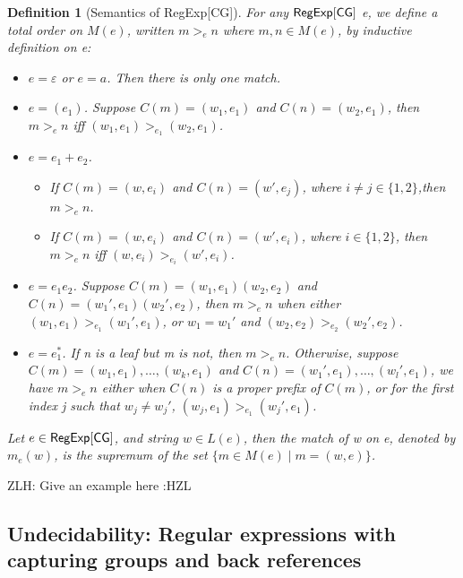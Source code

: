 \documentclass[sigplan,review,anonymous]{acmart}\settopmatter{printfolios=true,printccs=false,printacmref=false}
\newcommand{\zhilei}[1]{\color{violet} {ZLH: #1 :HZL} \color{black}}
\newcommand{\zhilei}[1]{}
\newtheorem{definition}{Definition}
\begin{document}
\begin{definition}[Semantics of RegExp{[\sf CG]}]
  For any ${\sf RegExp}[\sf CG]$ e, we define a total order on $M (e)$, written $m
  >_e n$ where $m, n \in M (e)$, by inductive definition on e:
  \begin{itemize}
    \item $e = \varepsilon$ or $e = a$. Then there is only one match.
    
    \item $e = (e_1)$. Suppose $C (m) = (w_1, e_1)$ and $C (n) = (w_2, e_1)$,
    then $m >_e n$ iff $(w_1, e_1) >_{e_1} (w_2, e_1)$.
    
    \item $e = e_1 + e_2$.
    \begin{itemize}
      \item If $C (m) = (w, e_i)$ and $C (n) = (w', e_j)$, where $i \neq j \in
      \{ 1, 2 \}$,then $m >_e n$.
      
      \item If $C (m) = (w, e_i)$ and $C (n) = (w', e_i)$, where $i \in \{ 1,
      2 \}$, then $m >_e n$ iff $(w, e_i) >_{e_i} (w', e_i)$.
    \end{itemize}
    \item $e = e_1 e_2$. Suppose $C (m) = (w_1, e_1) (w_2, e_2)$ and $C (n) =
    (w_1', e_1) (w_2', e_2)$, then $m >_e n$ when either $(w_1, e_1) >_{e_1}
    (w_1', e_1)$, or $w_1 = w_1'$ and $(w_2, e_2) >_{e_2} (w_2', e_2)$.
    
    \item $e = e_1^{\ast}$. If n is a leaf but m is not, then $m >_e n$.
    Otherwise, suppose $C (m) = (w_1, e_1), \ldots, (w_k, e_1)$ and $C (n) =
    (w_1', e_1), \ldots, (w_l', e_1)$, we have $m >_e n$ either when $C (n)$
    is a proper prefix of $C (m)$, or for the first index j such that $w_j
    \neq w_j'$, $(w_j, e_1) >_{e_1} (w_j', e_1)$.
  \end{itemize}
  Let $e \in {\sf RegExp}[\sf CG]$, and string $w \in L (e)$, then the match of w
  on e, denoted by $m_e (w)$, is the supremum of the set $\{ m \in M (e) \mid m = (w, e) \}$.
\end{definition}

\zhilei{Give an example here}

\subsection{Undecidability: Regular expressions with capturing groups and back references}
\end{document}
